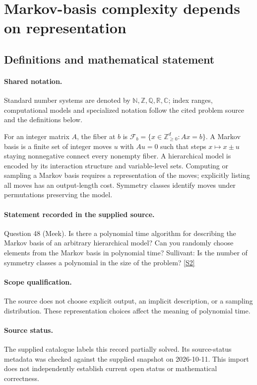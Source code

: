 \documentclass[11pt]{article}
\newcommand{\sref}[2]{\hyperlink{source:#1:#2}{[S#2]}}
\begin{document}
\section{Markov-basis complexity depends on representation}\label{statement}

\subsection{Definitions and mathematical statement}

\paragraph{Shared notation.}Standard number systems are denoted by $\mathbb N,\mathbb Z,\mathbb Q,\mathbb R,\mathbb C$; index ranges, computational models and specialized notation follow the cited problem source and the definitions below.


For an integer matrix $A$, the fiber at $b$ is $\mathcal F_b=\{x\in\mathbb Z_{\ge0}^d:Ax=b\}$. A Markov basis is a finite set of integer moves $u$ with $Au=0$ such that steps $x\mapsto x\pm u$ staying nonnegative connect every nonempty fiber. A hierarchical model is encoded by its interaction structure and variable-level sets. Computing or sampling a Markov basis requires a representation of the moves; explicitly listing all moves has an output-length cost. Symmetry classes identify moves under permutations preserving the model.
\paragraph{Statement recorded in the supplied source.}
Question 48 (Meek). Is there a polynomial time algorithm for describing the Markov basis of an arbitrary hierarchical model? Can you randomly choose elements from the Markov basis in polynomial time? Sullivant: Is the number of symmetry classes a polynomial in the size of the problem? \sref{statement}{2}
\paragraph{Scope qualification.}
The source does not choose explicit output, an implicit description, or a sampling distribution. These representation choices affect the meaning of polynomial time.
\paragraph{Source status.}
The supplied catalogue labels this record partially solved. Its source-status metadata was checked against the supplied snapshot on 2026-10-11. This import does not independently establish current open status or mathematical correctness.
\end{document}
